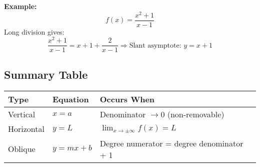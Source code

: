 \textbf{Example:}
\[
f(x) = \frac{x^2 + 1}{x - 1}
\]
Long division gives:
\[
\frac{x^2 + 1}{x - 1} = x + 1 + \frac{2}{x - 1}
\Rightarrow \text{Slant asymptote: } y = x + 1
\]

\subsection{Summary Table}

\begin{center}
\begin{tabular}{|l|l|l|}
\hline
\textbf{Type} & \textbf{Equation} & \textbf{Occurs When} \\
\hline
Vertical      & \(x = a\)           & Denominator \(\to 0\) (non-removable) \\
Horizontal    & \(y = L\)           & \(\lim_{x \to \pm \infty} f(x) = L\) \\
Oblique       & \(y = mx + b\)      & Degree numerator = degree denominator + 1 \\
\hline
\end{tabular}
\end{center}

\newpage